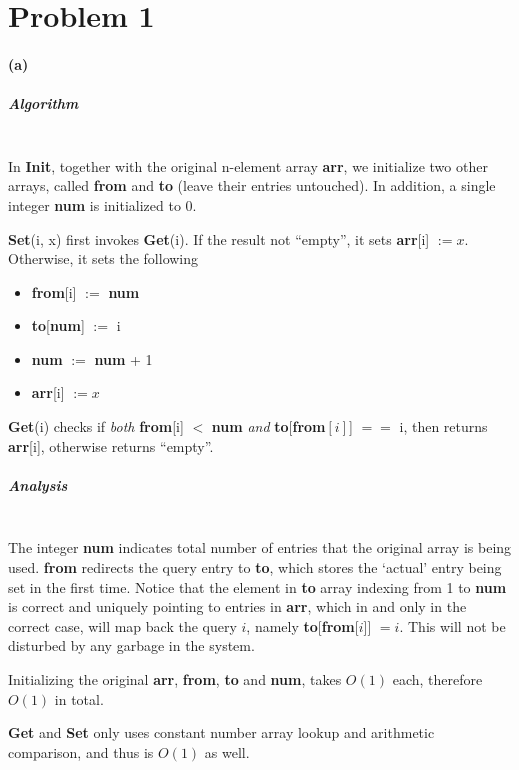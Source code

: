 \documentclass[12pt]{article}
\begin{document}
	
\section*{Problem 1}
\paragraph{(a)}
\subparagraph{Algorithm}
~\\

In \textbf{Init}, together with the original n-element array \textbf{arr}, we initialize two other arrays, called \textbf{from} and \textbf{to} (leave their entries untouched). In addition, a single integer \textbf{num} is initialized to 0. 

\textbf{Set}(i, x) first invokes \textbf{Get}(i). If the result not ``empty'', it sets \textbf{arr}[i] $:= x$. Otherwise, it sets the following
\begin{itemize}
	\item \textbf{from}[i] $:=$ \textbf{num}
	\item \textbf{to}[\textbf{num}] $:=$ i
	\item \textbf{num} $:=$ \textbf{num} + 1
	\item \textbf{arr}[i] $:= x$
\end{itemize}

\textbf{Get}(i) checks if \emph{both} \textbf{from}[i] $<$ \textbf{num} \emph{and} \textbf{to}[\textbf{from}$[i]$] $==$ i, then returns \textbf{arr}[i], otherwise returns ``empty''.
\subparagraph{Analysis}
~\\

The integer \textbf{num} indicates total number of entries that the original array is being used. \textbf{from} redirects the query entry to \textbf{to}, which stores the `actual' entry being set in the first time. Notice that the element in \textbf{to} array indexing from 1 to \textbf{num} is correct and uniquely pointing to entries in \textbf{arr}, which in and only in the correct case, will map back the query $i$, namely \textbf{to}[\textbf{from}[$i$]] $= i$. This will not be disturbed by any garbage in the system.

Initializing the original \textbf{arr}, \textbf{from}, \textbf{to} and \textbf{num}, takes $O(1)$ each, therefore $O(1)$ in total. 

\textbf{Get} and \textbf{Set} only uses constant number array lookup and arithmetic comparison, and thus is $O(1)$ as well. 

\pagebreak
\end{document}
